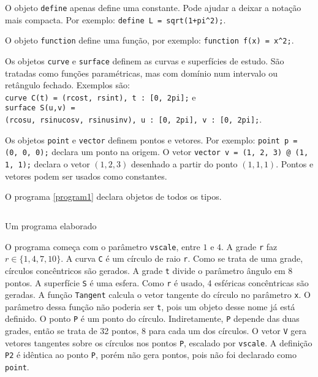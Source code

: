 \documentclass[10pt,a4paper]{article}
\newenvironment{code}{\captionsetup{type=listing}}{}
\begin{document}
O objeto \texttt{define} apenas define uma constante.
Pode ajudar a deixar a notação mais compacta. Por exemplo: \texttt{define L = sqrt(1+pi\textasciicircum 2);}.

O objeto \texttt{function} define uma função, por exemplo: \texttt{function f(x) = x\textasciicircum 2;}.

Os objetos \texttt{curve} e \texttt{surface} definem as curvas e superfícies de estudo.
São tratadas como funções paramétricas, mas com domínio num intervalo ou retângulo fechado.
Exemplos são: \\ \texttt{curve C(t) = (rcost, rsint), t : [0, 2pi];} e
\\ \texttt{surface S(u,v) = \\ (rcosu, rsinucosv, rsinusinv), u : [0, 2pi], v : [0, 2pi];}.

Os objetos \texttt{point} e \texttt{vector} definem pontos e vetores.
Por exemplo: \texttt{point p = (0, 0, 0);} declara um ponto na origem.
O vetor \texttt{vector v = (1, 2, 3) @ (1, 1, 1);} declara o vetor $(1,2,3)$ desenhado a partir do ponto $(1,1,1)$.
Pontos e vetores podem ser usados como constantes.


\newpage
O programa \ref{program1} declara objetos de todos os tipos.

\begin{code}
\inputminted[linenos,frame=single,escapeinside=||]{text}{program1.tex}
\caption{Um programa elaborado}
\label{program1}
\end{code}

O programa começa com o parâmetro \texttt{vscale}, entre $1$ e $4$.
A grade \texttt{r} faz $r \in \{1, 4, 7, 10\}$.
A curva \texttt{C} é um círculo de raio \texttt{r}.
Como se trata de uma grade, círculos concêntricos são gerados.
A grade \texttt{t} divide o parâmetro ângulo em 8 pontos.
A superfície \texttt{S} é uma esfera. Como \texttt{r} é usado, 4 esféricas concêntricas são geradas.
A função \texttt{Tangent} calcula o vetor tangente do círculo no parâmetro \texttt{x}.
O parâmetro dessa função não poderia ser \texttt{t}, pois um objeto desse nome já está definido.
O ponto \texttt{P} é um ponto do círculo.
Indiretamente, \texttt{P} depende das duas grades, então se trata de 32 pontos, 8 para cada um dos círculos.
O vetor \texttt{V} gera vetores tangentes sobre os círculos nos pontos \texttt{P}, escalado por \texttt{vscale}.
A definição \texttt{P2} é idêntica ao ponto \texttt{P}, porém não gera pontos, pois não foi declarado como \texttt{point}.

\end{document}
